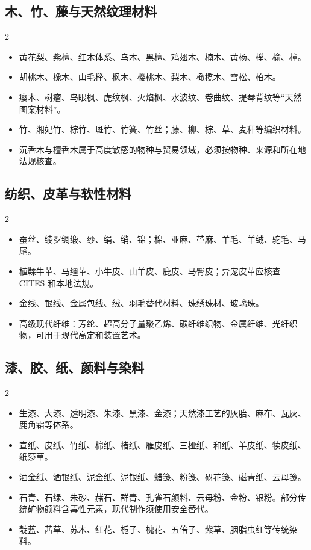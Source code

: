 \documentclass[lang=en,a4paper,11pt]{elegantpaper}
\begin{document}
\subsection{木、竹、藤与天然纹理材料}


\begin{multicols}{2}
\begin{itemize}
\item 黄花梨、紫檀、红木体系、乌木、黑檀、鸡翅木、楠木、黄杨、榉、榆、樟。
\item 胡桃木、橡木、山毛榉、枫木、樱桃木、梨木、橄榄木、雪松、柏木。
\item 瘿木、树瘤、鸟眼枫、虎纹枫、火焰枫、水波纹、卷曲纹、提琴背纹等“天然图案材料”。
\item 竹、湘妃竹、棕竹、斑竹、竹簧、竹丝；藤、柳、棕、草、麦秆等编织材料。
\item 沉香木与檀香木属于高度敏感的物种与贸易领域，必须按物种、来源和所在地法规核查。
\end{itemize}
\end{multicols}

\subsection{纺织、皮革与软性材料}


\begin{multicols}{2}
\begin{itemize}
\item 蚕丝、绫罗绸缎、纱、绢、绡、锦；棉、亚麻、苎麻、羊毛、羊绒、驼毛、马尾。
\item 植鞣牛革、马缰革、小牛皮、山羊皮、鹿皮、马臀皮；异宠皮革应核查 CITES 和本地法规。
\item 金线、银线、金属包线、绒、羽毛替代材料、珠绣珠材、玻璃珠。
\item 高级现代纤维：芳纶、超高分子量聚乙烯、碳纤维织物、金属纤维、光纤织物，可用于现代高定和装置艺术。
\end{itemize}
\end{multicols}

\subsection{漆、胶、纸、颜料与染料}


\begin{multicols}{2}
\begin{itemize}
\item 生漆、大漆、透明漆、朱漆、黑漆、金漆；天然漆工艺的灰胎、麻布、瓦灰、鹿角霜等体系。
\item 宣纸、皮纸、竹纸、棉纸、楮纸、雁皮纸、三桠纸、和纸、羊皮纸、犊皮纸、纸莎草。
\item 洒金纸、洒银纸、泥金纸、泥银纸、蜡笺、粉笺、砑花笺、磁青纸、云母笺。
\item 石青、石绿、朱砂、赭石、群青、孔雀石颜料、云母粉、金粉、银粉。部分传统矿物颜料含毒性元素，现代制作须使用安全替代。
\item 靛蓝、茜草、苏木、红花、栀子、槐花、五倍子、紫草、胭脂虫红等传统染料。
\end{itemize}
\end{multicols}
\end{document}
